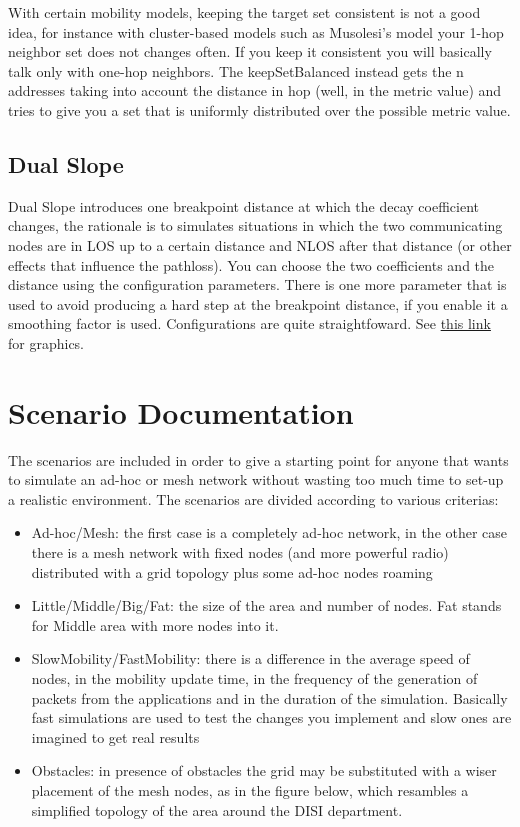 \documentclass[12pt, a4]{article}
\theoremstyle{definition}
\begin{document}
With certain mobility models, keeping the target set consistent is not a good
idea, for instance with cluster-based models such as Musolesi’s model your 1-hop
neighbor set does not changes often. If you keep it consistent you will
basically talk only with one-hop neighbors. The keepSetBalanced instead gets the
n addresses taking into account the distance in hop (well, in the metric value)
and tries to give you a set that is uniformly distributed over the possible
metric value.

\subsection{Dual Slope}

Dual Slope introduces one breakpoint distance at which the decay coefficient
changes, the rationale is to simulates situations in which the two communicating
nodes are in LOS up to a certain distance and NLOS after that distance (or other
effects that influence the pathloss). You can choose the two coefficients and
the distance using the configuration parameters. There is one more parameter
that is used to avoid producing a hard step at the breakpoint distance, if you
enable it a smoothing factor is used. Configurations are quite straightfoward. 
See \href{http://pervacy.eu/?p=65}{this link} for graphics.

\section{Scenario Documentation}

The scenarios are included in order to give a starting point for anyone that
wants to simulate an ad-hoc or mesh network without wasting too much time to
set-up a realistic environment. The scenarios are divided according to various
criterias:
\begin{itemize}
\item Ad-hoc/Mesh: the first case is a completely ad-hoc network, in the other
case there is a mesh network with fixed nodes (and more powerful radio)
distributed with a grid topology plus some ad-hoc nodes roaming
\item Little/Middle/Big/Fat: the size of the area and number of nodes. Fat
stands for Middle area with more nodes into it.
\item SlowMobility/FastMobility: there is a difference in the average speed of
nodes, in the mobility update time, in the frequency of the generation of
packets from the applications and in the duration of the simulation.
Basically fast simulations are used to test the changes you implement and slow
ones are imagined to get real results
\item Obstacles: in presence of obstacles the grid may be substituted with a
wiser placement of the mesh nodes, as in the figure below, which resambles a
simplified topology of the area around the DISI department.
\end{itemize}
\end{document}

